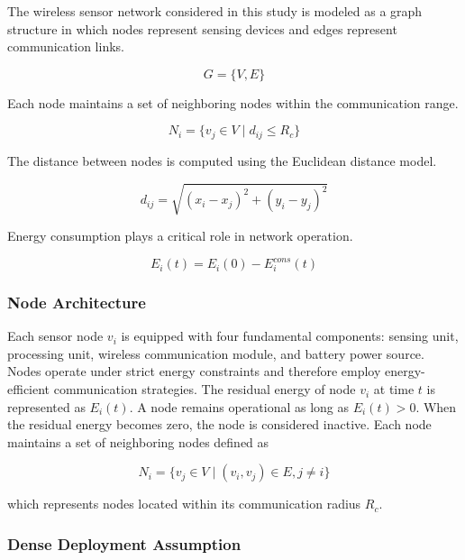 \documentclass[a4paper,fleqn]{cas-dc}
\numberwithin{equation}{section}
\begin{document}
The wireless sensor network considered in this study is modeled as a graph structure in which nodes represent sensing devices and edges represent communication links.

\begin{equation}
G = \{V, E\}
\label{eq:graph_model}
\end{equation}

Each node maintains a set of neighboring nodes within the communication range.

\begin{equation}
N_i = \{v_j \in V \mid d_{ij} \leq R_c\}
\label{eq:neighbor_set}
\end{equation}

The distance between nodes is computed using the Euclidean distance model.

\begin{equation}
d_{ij} = \sqrt{(x_i - x_j)^2 + (y_i - y_j)^2}
\label{eq:distance}
\end{equation}

Energy consumption plays a critical role in network operation.

\begin{equation}
E_i(t) = E_i(0) - E_i^{cons}(t)
\label{eq:residual_energy}
\end{equation}

\subsubsection{Node Architecture}

Each sensor node $v_i$ is equipped with four fundamental components: sensing unit, processing unit, wireless communication module, and battery power source. Nodes operate under strict energy constraints and therefore employ energy-efficient communication strategies. The residual energy of node $v_i$ at time $t$ is represented as $E_i(t)$. A node remains operational as long as $E_i(t) > 0$. When the residual energy becomes zero, the node is considered inactive. Each node maintains a set of neighboring nodes defined as

\begin{equation}
N_i = \{ v_j \in V \mid (v_i,v_j) \in E , j \neq i \}
\end{equation}

which represents nodes located within its communication radius $R_c$.

\subsubsection{Dense Deployment Assumption}
\end{document}
